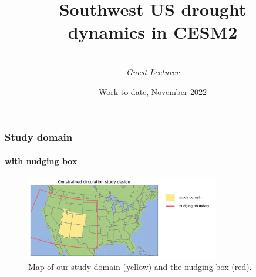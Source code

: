 \documentclass{beamer}
\title[SW droughts]{Southwest US drought \\ dynamics in CESM2} %
\author%
{%
    \sc{E. Noether}\\
    \textit{Guest Lecturer}
}
\institute%
{%
    \textit{Mathematical Institute}\\
    \textit{University of Oxford}
}
\date[Nov-2022]{Work to date, November 2022} %
\begin{document}
    \begin{frame}[plain]
        \titlepage
    \end{frame}
    \begin{frame}
        \frametitle{Study domain}
        \framesubtitle{with nudging box}

        \begin{figure}[h]
        \centering
        \includegraphics[width=20pc]{figs/domain.pdf}
        \caption{Map of our study domain (yellow) and the nudging box (red).}
        \label{fig:domain}
        \end{figure}

    \end{frame}
\end{document}
